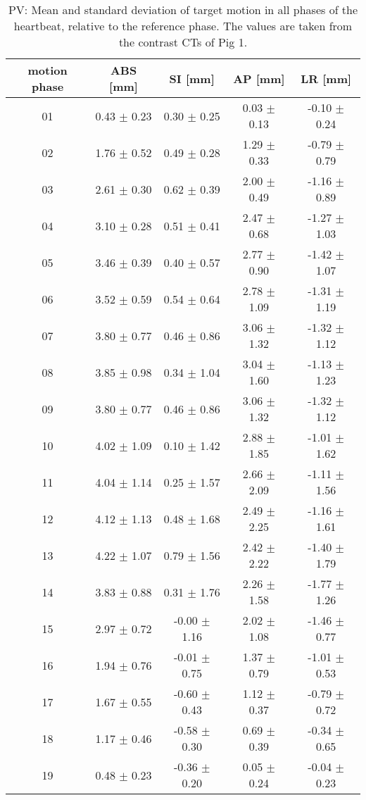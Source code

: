 \begin{table}[H]
  \centering
     \tiny 
  \caption{PV: Mean and standard deviation of target motion in all phases of the heartbeat, relative to the reference phase. The values are 
  taken from the contrast CTs of Pig 1.}
  \begin{tabular}{|c|c|c|c|c|}
    \hline\hline
    motion phase\rule{0pt}{2.6ex}\rule[-1.2ex]{0pt}{0pt} & ABS [mm] & SI [mm] & AP [mm] & LR [mm]\\
    \hline
01 &0.43 $\pm$ 0.23 &0.30 $\pm$ 0.25 &0.03 $\pm$ 0.13 &-0.10 $\pm$ 0.24 \\
02 &1.76 $\pm$ 0.52 &0.49 $\pm$ 0.28 &1.29 $\pm$ 0.33 &-0.79 $\pm$ 0.79 \\
03 &2.61 $\pm$ 0.30 &0.62 $\pm$ 0.39 &2.00 $\pm$ 0.49 &-1.16 $\pm$ 0.89 \\
04 &3.10 $\pm$ 0.28 &0.51 $\pm$ 0.41 &2.47 $\pm$ 0.68 &-1.27 $\pm$ 1.03 \\
05 &3.46 $\pm$ 0.39 &0.40 $\pm$ 0.57 &2.77 $\pm$ 0.90 &-1.42 $\pm$ 1.07 \\
06 &3.52 $\pm$ 0.59 &0.54 $\pm$ 0.64 &2.78 $\pm$ 1.09 &-1.31 $\pm$ 1.19 \\
07 &3.80 $\pm$ 0.77 &0.46 $\pm$ 0.86 &3.06 $\pm$ 1.32 &-1.32 $\pm$ 1.12 \\
08 &3.85 $\pm$ 0.98 &0.34 $\pm$ 1.04 &3.04 $\pm$ 1.60 &-1.13 $\pm$ 1.23 \\
09 &3.80 $\pm$ 0.77 &0.46 $\pm$ 0.86 &3.06 $\pm$ 1.32 &-1.32 $\pm$ 1.12 \\
10 &4.02 $\pm$ 1.09 &0.10 $\pm$ 1.42 &2.88 $\pm$ 1.85 &-1.01 $\pm$ 1.62 \\
11 &4.04 $\pm$ 1.14 &0.25 $\pm$ 1.57 &2.66 $\pm$ 2.09 &-1.11 $\pm$ 1.56 \\
12 &4.12 $\pm$ 1.13 &0.48 $\pm$ 1.68 &2.49 $\pm$ 2.25 &-1.16 $\pm$ 1.61 \\
13 &4.22 $\pm$ 1.07 &0.79 $\pm$ 1.56 &2.42 $\pm$ 2.22 &-1.40 $\pm$ 1.79 \\
14 &3.83 $\pm$ 0.88 &0.31 $\pm$ 1.76 &2.26 $\pm$ 1.58 &-1.77 $\pm$ 1.26 \\
15 &2.97 $\pm$ 0.72 &-0.00 $\pm$ 1.16 &2.02 $\pm$ 1.08 &-1.46 $\pm$ 0.77 \\
16 &1.94 $\pm$ 0.76 &-0.01 $\pm$ 0.75 &1.37 $\pm$ 0.79 &-1.01 $\pm$ 0.53 \\
17 &1.67 $\pm$ 0.55 &-0.60 $\pm$ 0.43 &1.12 $\pm$ 0.37 &-0.79 $\pm$ 0.72 \\
18 &1.17 $\pm$ 0.46 &-0.58 $\pm$ 0.30 &0.69 $\pm$ 0.39 &-0.34 $\pm$ 0.65 \\
19 &0.48 $\pm$ 0.23 &-0.36 $\pm$ 0.20 &0.05 $\pm$ 0.24 &-0.04 $\pm$ 0.23 \\
    \hline\hline
  \end{tabular}
  \label{tab:motion:PV:Pig1}
\end{table}

